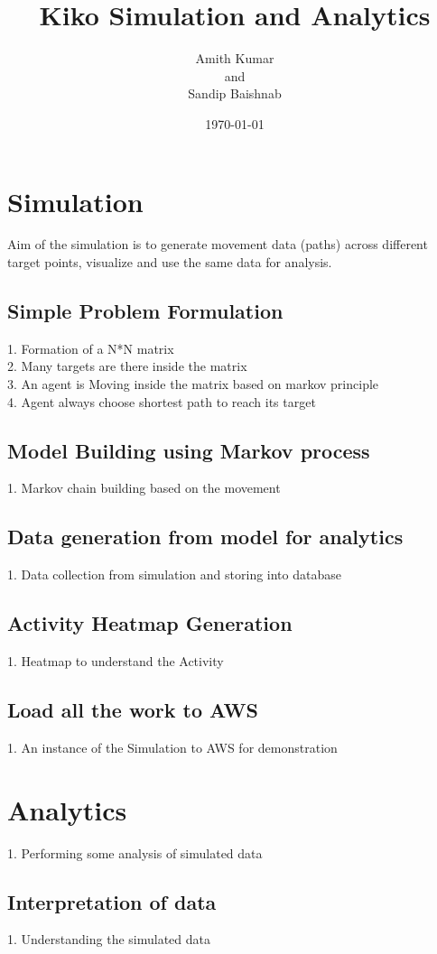 \documentclass[11pt]{report}
\title{\color{cyan} \textbf{Kiko Simulation and Analytics}}
\author{Amith Kumar\\and \\Sandip Baishnab}
\date{\today}
\begin{document}
\maketitle
\tableofcontents

\newpage
\section{\color{cyan} Simulation }
Aim of the simulation is to generate movement data (paths) across different target points, visualize and use the same data for analysis.
\subsection{Simple Problem Formulation}
1. Formation of a N*N matrix\\
2. Many targets are there inside the matrix\\
3. An agent is Moving inside the matrix based on markov principle\\
4. Agent always choose shortest path to reach its target\\
\subsection{Model Building using Markov process}
1. Markov chain building based on the movement
\subsection{Data generation from model for analytics}
1. Data collection from simulation and storing into database 
\subsection{Activity Heatmap Generation}
1. Heatmap to understand the Activity
\subsection{Load all the work to AWS }
1. An instance of the Simulation to AWS for demonstration

\newpage
\section{\color{cyan} Analytics}
1. Performing some analysis of simulated data
\subsection{Interpretation of data}
1. Understanding the simulated data
\end{document}

